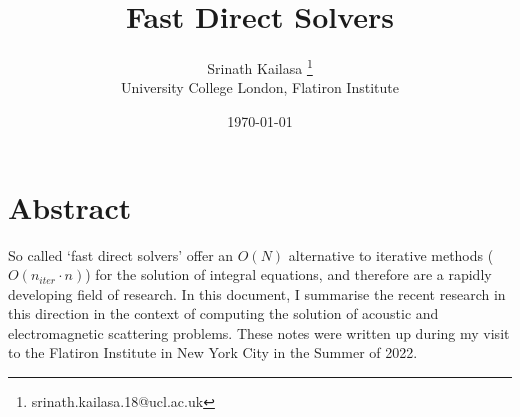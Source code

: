 \documentclass[12pt, a4, twoside]{article}
\title{Fast Direct Solvers}
\author{Srinath Kailasa \thanks{srinath.kailasa.18@ucl.ac.uk} \\ \small University College London, \small Flatiron Institute}
\date{\today}
\begin{document}
\maketitle

\section*{Abstract}
So called `fast direct solvers' offer an $O(N)$ alternative to iterative methods ($O(n_{iter} \cdot n)$) for the solution of integral equations, and therefore are a rapidly developing field of research. In this document, I summarise the recent research in this direction in the context of computing the solution of acoustic and electromagnetic scattering problems. These notes were written up during my visit to the Flatiron Institute in New York City in the Summer of 2022.
\end{document}
